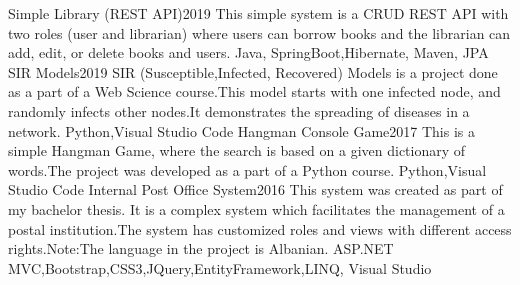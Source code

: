 %
%
%


\begin{projects}
	
	
\project
	{Simple Library (REST API)}{2019}
	{ 	}
	{This simple system is a CRUD REST API with two roles (user and librarian) where users can borrow books and the librarian can add, edit, or delete books and users. }
	{Java, SpringBoot,Hibernate, Maven, JPA}
	\project
	{SIR Models}{2019}
	{ 	}
	{SIR (Susceptible,Infected, Recovered) Models is a project done as a part of a Web Science course.This model starts with one infected node, and randomly infects other nodes.It demonstrates the spreading of diseases in a network.}
	{Python,Visual Studio Code}
	\project
	{Hangman Console Game}{2017}
	{ 	}
	{This is a simple Hangman Game, where the search is based on a given dictionary of words.The project was developed as a part of a Python course.}
	{Python,Visual Studio Code}
	\project
	{Internal Post Office System}{2016}
	{ 	}
	{This system was created as part of my bachelor thesis. It is a complex system which facilitates the management of a postal institution.The system has customized roles and views with different access rights.Note:The language in the project is Albanian.}
	{ASP.NET MVC,Bootstrap,CSS3,JQuery,EntityFramework,LINQ, Visual Studio}


\end{projects}
			
	
